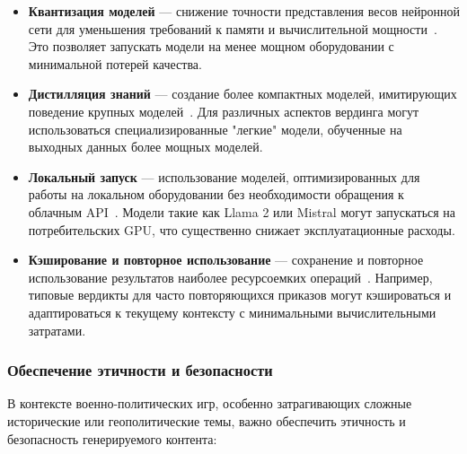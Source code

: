 \begin{itemize}
    \item \textbf{Квантизация моделей} — снижение точности представления весов нейронной сети для уменьшения требований к памяти и вычислительной мощности~\cite{dettmers2022llm}. Это позволяет запускать модели на менее мощном оборудовании с минимальной потерей качества.

    \item \textbf{Дистилляция знаний} — создание более компактных моделей, имитирующих поведение крупных моделей~\cite{hinton2015distilling}. Для различных аспектов вердинга могут использоваться специализированные "{}легкие"{} модели, обученные на выходных данных более мощных моделей.

    \item \textbf{Локальный запуск} — использование моделей, оптимизированных для работы на локальном оборудовании без необходимости обращения к облачным API~\cite{touvron2023llama}. Модели такие как Llama 2 или Mistral могут запускаться на потребительских GPU, что существенно снижает эксплуатационные расходы.

    \item \textbf{Кэширование и повторное использование} — сохранение и повторное использование результатов наиболее ресурсоемких операций~\cite{wallace2022automated}. Например, типовые вердикты для часто повторяющихся приказов могут кэшироваться и адаптироваться к текущему контексту с минимальными вычислительными затратами.
\end{itemize}

\subsubsection{Обеспечение этичности и безопасности}

В контексте военно-политических игр, особенно затрагивающих сложные исторические или геополитические темы, важно обеспечить этичность и безопасность генерируемого контента:

